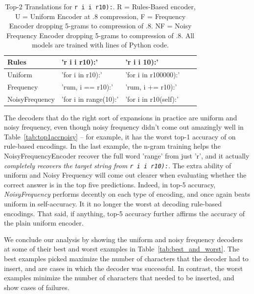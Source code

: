 \documentclass{article}
\begin{document}
\begin{table}[h!]
\centering
\begin{tabular}{|l|l|l|l|l|}
\hline
Rules  & 'r i i r10):' & 'r i i  10):'                  \\ \hline
Uniform  & 'for i in r10):' & 'for i in r100000):'        \\ \hline
Frequency  & 'rum, i == r10):' & 'rum, i += r10):'          \\ \hline
NoisyFrequency & 'for i in range(10):' & 'for i in r10(self):'  \\ \hline
\end{tabular}
\bigskip
\caption{Top-2 Translations for \texttt{r i i r10):}. R = Rules-Based encoder, U = Uniform Encoder at .8 compression, F = Frequency Encoder dropping 5-grams to compression of .8. NF = Noisy Frequency Encoder dropping 5-grams to compression of .8. All models are trained with lines of Python code.
}
\label{tab:translations_harder}
\end{table}

The decoders that do the right sort of expansions in practice are uniform and noisy frequency, even though noisy frequency didn't come out amazingly well in Table~\ref{tab:top1accnoisy} -- for example, it has the worst top-1 accuracy of on rule-based encodings. In the last example, the n-gram training helps the NoisyFrequencyEncoder recover the full word 'range' from just 'r', and it actually \emph{completely recovers the target string from \texttt{r i i r10):}}. The extra ability of uniform and Noisy Frequency will come out clearer when evaluating whether the correct answer is in the top five predictions.
Indeed, in top-5 accuracy, \emph{NoisyFrequency} performs decently on each type of encoding, and once again beats uniform in self-accuracy. It it no longer the worst at decoding rule-based encodings. That said, if anything, top-5 accuracy
further affirms the accuracy of the plain uniform encoder.

We conclude our analysis by showing the uniform and noisy frequency decoders at some of their best and worst examples in
Table~\ref{tab:best_and_worst}. The best examples picked
maximize the number of characters that the decoder had to
insert, and are cases in which the decoder was successful.
In contrast, the worst examples minimize the number of
characters that needed to be inserted, and show cases
of failures.
\end{document}
